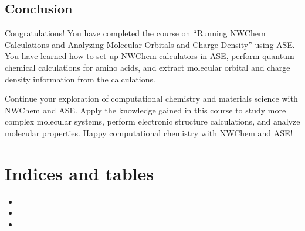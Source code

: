 \documentclass[letterpaper,10pt,english]{sphinxmanual}
\begin{document}
\section{Conclusion}
\label{\detokenize{nwase/nwase:conclusion}}
\sphinxAtStartPar
Congratulations! You have completed the course on “Running NWChem Calculations and Analyzing Molecular Orbitals and Charge Density” using ASE. You have learned how to set up NWChem calculators in ASE, perform quantum chemical calculations for amino acids, and extract molecular orbital and charge density information from the calculations.

\sphinxAtStartPar
Continue your exploration of computational chemistry and materials science with NWChem and ASE. Apply the knowledge gained in this course to study more complex molecular systems, perform electronic structure calculations, and analyze molecular properties. Happy computational chemistry with NWChem and ASE!


\chapter{Indices and tables}
\label{\detokenize{index:indices-and-tables}}\begin{itemize}
\item {} 
\sphinxAtStartPar
{}

\item {} 
\sphinxAtStartPar
{}

\item {} 
\sphinxAtStartPar
{}

\end{itemize}



\renewcommand{\indexname}{Index}
\printindex
\end{document}
